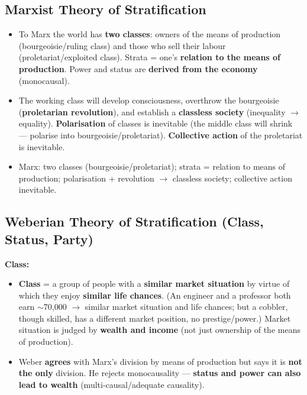 \subsection{Marxist Theory of Stratification}

\begin{KeyConcept}
\begin{itemize}
\item To Marx the world has \textbf{two classes}: owners of the means of production (bourgeoisie/ruling class) and those who sell their labour (proletariat/exploited class). Strata = one's \textbf{relation to the means of production}. Power and status are \textbf{derived from the economy} (monocausal).
\item The working class will develop consciousness, overthrow the bourgeoisie (\textbf{proletarian revolution}), and establish a \textbf{classless society} (inequality $\rightarrow$ equality). \textbf{Polarisation} of classes is inevitable (the middle class will shrink --- polarise into bourgeoisie/proletariat). \textbf{Collective action} of the proletariat is inevitable.
\end{itemize}
\end{KeyConcept}

\begin{QuickRevision}
\begin{itemize}
\item Marx: two classes (bourgeoisie/proletariat); strata = relation to means of production; polarisation + revolution $\rightarrow$ classless society; collective action inevitable.
\end{itemize}
\end{QuickRevision}

\sectiondivider

\subsection{Weberian Theory of Stratification (Class, Status, Party)}

\begin{KeyConcept}
\textbf{Class:}
\begin{itemize}
\item \textbf{Class} = a group of people with a \textbf{similar market situation} by virtue of which they enjoy \textbf{similar life chances}. (An engineer and a professor both earn $\sim$70,000 $\rightarrow$ similar market situation and life chances; but a cobbler, though skilled, has a different market position, no prestige/power.) Market situation is judged by \textbf{wealth and income} (not just ownership of the means of production).
\item Weber \textbf{agrees} with Marx's division by means of production but says it is \textbf{not the only} division. He rejects monocausality --- \textbf{status and power can also lead to wealth} (multi-causal/adequate causality).
\end{itemize}
\end{KeyConcept}

